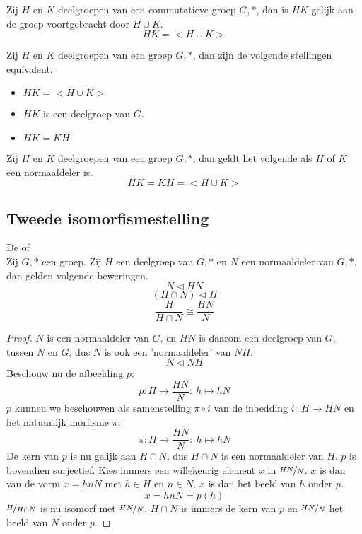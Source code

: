 \documentclass[main.tex]{subfiles}
\begin{document}
\begin{st}
  Zij $H$ en $K$ deelgroepen van een commutatieve groep $G,*$, dan is $HK$ gelijk aan de groep voortgebracht door $H\cup K$.
  \[ HK = <H\cup K> \]
\end{st}

\begin{pr}
  Zij $H$ en $K$ deelgroepen van een groep $G,*$, dan zijn de volgende stellingen equivalent.
  \begin{itemize}
  \item $HK = <H\cup K>$
  \item $HK$ is een deelgroep van $G$.
  \item $HK = KH$
  \end{itemize}
\end{pr}

\begin{gev}
  \label{gev:hk-deelgroep-als-h-of-k-normaaldeler}
  Zij $H$ en $K$ deelgroepen van een groep $G,*$, dan geldt het volgende als $H$ of $K$ een normaaldeler is.
  \[ HK = KH = <H\cup K> \]
\end{gev}

\subsection{Tweede isomorfismestelling}


\begin{st}
  De  of \\
  Zij $G,*$ een groep. Zij $H$ een deelgroep van $G,*$ en $N$ een normaaldeler van $G,*$, dan gelden volgende beweringen.
  \[ N \triangleleft HN \]
  \[ (H \cap N) \triangleleft H \]
  \[ \frac{H}{H\cap N} \cong \frac{HN}{N} \]

  \begin{proof}
    $N$ is een normaaldeler van $G$, en $HN$ is daarom een deelgroep van $G$, tussen $N$ en $G$, dus $N$ is ook een 'normaaldeler' van $NH$.
    \[ N \triangleleft NH \]
    Beschouw nu de afbeelding $p$:
    \[ p: H \rightarrow \frac{HN}{N}:\ h \mapsto hN \]
    $p$ kunnen we beschouwen als samenstelling $\pi \circ i$ van de inbedding $i:\ H\rightarrow HN$ en het natuurlijk morfisme $\pi$:
    \[ \pi: H \rightarrow \frac{HN}{N}:\ h \mapsto hN \]
    De kern van $p$ is nu gelijk aan $H\cap N$, dus $H \cap N$ is een normaaldeler van $H$.
    $p$ is bovendien surjectief.
    Kies immers een willekeurig element $x$ in $\nicefrac{HN}{N}$.
    $x$ is dan van de vorm $x=hnN$ met $h\in H$ en $n\in N$.
    $x$ is dan het beeld van $h$ onder $p$.
    \[ x = hnN = p(h) \]
    $\nicefrac{H}{H\cap N}$ is nu isomorf met $\nicefrac{HN}{N}$.
    $H\cap N$ is immers de kern van $p$ en $\nicefrac{HN}{N}$ het beeld van $N$ onder $p$.
  \end{proof}
\end{st}
\end{document}
